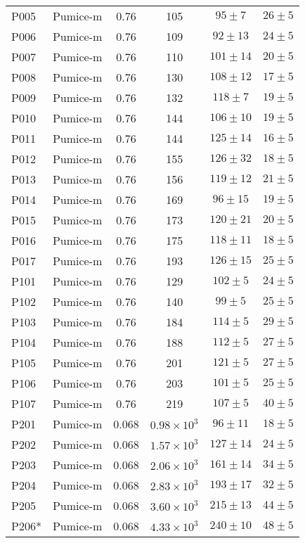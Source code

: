 \documentclass[3p,authoryear]{elsarticle}
\begin{document}
{\begin{longtable}[c]{ll|cccc}
	P005& Pumice-m & 0.76 & 105 & $95 \pm7$ & $26 \pm 5$ \\
	P006& Pumice-m & 0.76 & 109 &  $92 \pm 13$ & $24 \pm 5$ \\
	P007 & Pumice-m & 0.76 & 110 & $101 \pm 14$ & $20 \pm 5$\\
	P008 & Pumice-m & 0.76 & 130 & $108 \pm 12$ & $17 \pm5$\\
	P009& Pumice-m &0.76 & 132 & $118 \pm 7 $& $19 \pm 5$\\
	P010& Pumice-m & 0.76 & 144  & $106 \pm 10$ & $19 \pm 5$\\
	P011& Pumice-m & 0.76 & 144 & $125 \pm 14$ & $16 \pm 5$\\
	P012& Pumice-m &0.76 & 155 & $126 \pm 32$ & $18 \pm 5 $\\
	P013& Pumice-m & 0.76 & 156& $119 \pm 12$ & $21 \pm 5$\\
	P014& Pumice-m & 0.76 & 169 & $96 \pm 15$ & $19 \pm 5$ \\
	P015& Pumice-m & 0.76 & 173& $120 \pm 21$ & $20 \pm 5$ \\
	P016& Pumice-m &0.76 & 175  & $118 \pm 11$ & $18 \pm5$ \\
	P017 & Pumice-m & 0.76 & 193 & $126\pm15$ & $25\pm5 $ \\
	P101& Pumice-m & 0.76 & 129 & $102 \pm 5$ & $24\pm 5$\\
	P102& Pumice-m &0.76 & 140 & $99 \pm 5 $& $25 \pm 5$\\
	P103& Pumice-m &0.76 & 184 & $114 \pm 5$ & $29 \pm 5$\\
	P104& Pumice-m &0.76 & 188 & $112 \pm 5$ & $27 \pm 5$\\
	P105& Pumice-m &0.76 & 201 & $121 \pm 5$ & $27 \pm 5$\\
	P106& Pumice-m & 0.76 & 203 & $101 \pm 5$ & $25\pm5$\\
	P107& Pumice-m &0.76 & 219 & $107 \pm 5 $& $40 \pm 5$ \\
	P201  & Pumice-m & 0.068 & $0.98 \times 10^3$ & $96\pm 11$ & $18\pm 5 $ \\
	P202 &Pumice-m& 0.068 &$1.57\times 10^3$ & $127\pm14$ & $24\pm5$\\
	P203 & Pumice-m & 0.068 &$2.06 \times 10^3 $ & $161\pm14 $ & $34\pm 5$\\
	P204 & Pumice-m & 0.068 & $2.83\times10^3 $ & $193 \pm 17$ & $32 \pm 5$\\
	P205 & Pumice-m & 0.068 & $3.60 \times 10^3 $ & $215\pm 13 $ & $ 44 \pm 5 $ \\
	P206*&Pumice-m & 0.068 & $4.33\times 10^3$ & $240\pm10$ & $48\pm5$\\

\end{longtable}}
\end{document}
